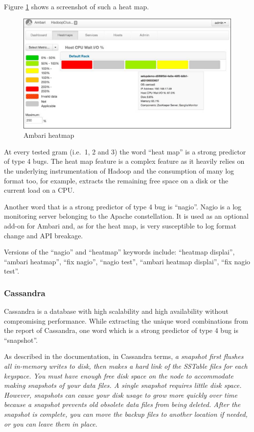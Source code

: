 \documentclass[12pt]{report}
\begin{document}
Figure \ref{fig:ambari-heatmap} shows a screenshot of such a heat map.

\begin{figure}[h!]
  \centering
    \includegraphics[scale=0.6]{media/chap9/ambari-heatmap.jpg}
    \caption{Ambari heatmap
    \label{fig:ambari-heatmap}}
\end{figure}

At every tested gram (i.e.~1, 2 and 3) the word ``heat map'' is a strong
predictor of type 4 bugs. The heat map feature is a complex feature as
it heavily relies on the underlying instrumentation of Hadoop and the
consumption of many log format too, for example, extracts the remaining
free space on a disk or the current load on a CPU.

Another word that is a strong predictor of type 4 bug is ``nagio''.
Nagio is a log monitoring server belonging to the Apache constellation.
It is used as an optional add-on for Ambari and, as for the heat map, is
very susceptible to log format change and API breakage.

Versions of the ``nagio'' and ``heatmap'' keywords include: ``heatmap
displai'', ``ambari heatmap'', ``fix nagio'', ``nagio test'', ``ambari
heatmap displai'', ``fix nagio test''.

\subsubsection{Cassandra}\label{cassandra}

Cassandra is a database with high scalability and high availability
without compromising performance. While extracting the unique word
combinations from the report of Cassandra, one word which is a strong
predictor of type 4 bug is ``snapshot''.

As described in the documentation, in Cassandra terms, \emph{a snapshot
first flushes all in-memory writes to disk, then makes a hard link of
the SSTable files for each keyspace. You must have enough free disk
space on the node to accommodate making snapshots of your data files. A
single snapshot requires little disk space. However, snapshots can cause
your disk usage to grow more quickly over time because a snapshot
prevents old obsolete data files from being deleted. After the snapshot
is complete, you can move the backup files to another location if
needed, or you can leave them in place.}
\end{document}
